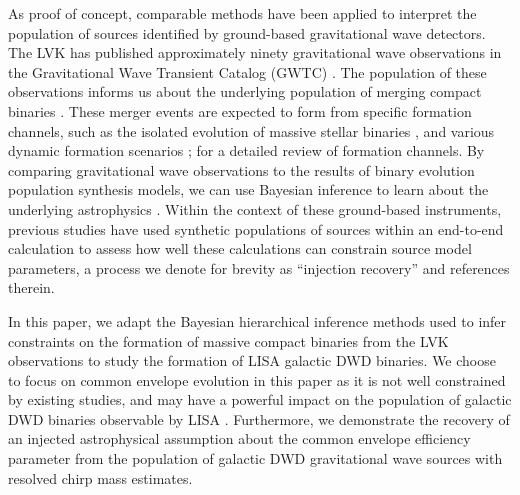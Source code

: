 \documentclass[twocolumn]{aastex631}
\newcommand*{\citepLVKRP}{\citep{LIGO-O3-O3a-RP, LIGO-O3-O3b-RP, LIGO-O3-O3b-NSBH}}
\newcommand*{\citepLVKIsolated}{\citep{Hurley2002,Eldridge2017,Giacobbo2017,Breivik2020,Belczynski2020-EvolutionaryRoads, broekgaarden2021formation,broekgaarden2021impact, posydon, Stevenson2022, st_inference_interp}}
\newcommand*{\citepLVKDynamic}{\citep{RomeroShawGW190521,Fragione_2020,Gayathri2022,Gamba2023Nature}}
\begin{document}
As proof of concept, comparable methods have been applied to interpret the population of sources identified by
ground-based gravitational wave detectors.
The LVK has published approximately ninety gravitational wave observations
    in the Gravitational Wave Transient Catalog (GWTC)
    \citep{GWTC-1, GWTC-2, GWTC-3, GWTC-2p1}.
The population of these observations informs us about the underlying population
    of merging compact binaries
    \citepLVKRP{}.
These merger events are expected to form from specific formation channels,
    such as the isolated evolution of massive stellar binaries
    \citepLVKIsolated{} ,
    and various dynamic formation scenarios
    \citepLVKDynamic{};  \citep[see][]{MANDEL20221} for a detailed review of formation channels.
By comparing gravitational wave observations to the results of
    binary evolution population synthesis models,
    we can use Bayesian inference to 
    learn about the underlying astrophysics
    \citep{COSMICZevin2021,Stevenson2017,st_inference_interp}.
Within the context of these ground-based instruments, previous studies have used synthetic populations of sources within
an end-to-end calculation to assess how well these calculations can constrain source model parameters, a process we
denote for brevity as ``injection recovery''
    \citep[see, e.g.,][]{Barrett2017,Wysocki2019,COSMICZevin2021} and references therein.

In this paper, we adapt the Bayesian hierarchical inference methods used
    to infer constraints on the formation of massive compact binaries
    from the LVK observations 
    \citep[e.g.][]{st_inference_interp} to study the formation of
    LISA galactic DWD binaries.
We choose to focus on common envelope evolution in this paper
    as it is not well constrained by existing studies, and
    may have a powerful impact on the population of 
    galactic DWD binaries observable by LISA
    \citep{Korol2022CE}.
Furthermore,
    we demonstrate the recovery of an injected astrophysical assumption
    about the common envelope efficiency parameter
    from the population of galactic DWD gravitational wave sources
    with resolved chirp mass estimates.
\end{document}
